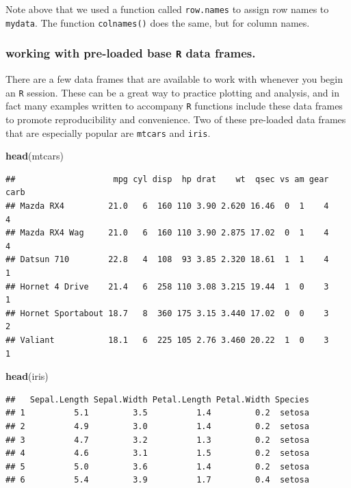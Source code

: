 \documentclass[]{book}
\newenvironment{Shaded}{\begin{snugshade}}{\end{snugshade}}
\newcommand{\KeywordTok}[1]{\textcolor[rgb]{0.13,0.29,0.53}{\textbf{#1}}}
\newcommand{\NormalTok}[1]{#1}
\begin{document}
Note above that we used a function called \texttt{row.names} to assign row names to \texttt{mydata}. The function \texttt{colnames()} does the same, but for column names.

\hypertarget{working-with-pre-loaded-base-r-data-frames.}{%
\subsubsection{\texorpdfstring{working with pre-loaded base \texttt{R} data frames.}{working with pre-loaded base R data frames.}}\label{working-with-pre-loaded-base-r-data-frames.}}

There are a few data frames that are available to work with whenever you begin an \texttt{R} session. These can be a great way to practice plotting and analysis, and in fact many examples written to accompany \texttt{R} functions include these data frames to promote reproducibility and convenience. Two of these pre-loaded data frames that are especially popular are \texttt{mtcars} and \texttt{iris}.

\begin{Shaded}
\begin{Highlighting}[]
\KeywordTok{head}\NormalTok{(mtcars)}
\end{Highlighting}
\end{Shaded}

\begin{verbatim}
##                    mpg cyl disp  hp drat    wt  qsec vs am gear carb
## Mazda RX4         21.0   6  160 110 3.90 2.620 16.46  0  1    4    4
## Mazda RX4 Wag     21.0   6  160 110 3.90 2.875 17.02  0  1    4    4
## Datsun 710        22.8   4  108  93 3.85 2.320 18.61  1  1    4    1
## Hornet 4 Drive    21.4   6  258 110 3.08 3.215 19.44  1  0    3    1
## Hornet Sportabout 18.7   8  360 175 3.15 3.440 17.02  0  0    3    2
## Valiant           18.1   6  225 105 2.76 3.460 20.22  1  0    3    1
\end{verbatim}

\begin{Shaded}
\begin{Highlighting}[]
\KeywordTok{head}\NormalTok{(iris)}
\end{Highlighting}
\end{Shaded}

\begin{verbatim}
##   Sepal.Length Sepal.Width Petal.Length Petal.Width Species
## 1          5.1         3.5          1.4         0.2  setosa
## 2          4.9         3.0          1.4         0.2  setosa
## 3          4.7         3.2          1.3         0.2  setosa
## 4          4.6         3.1          1.5         0.2  setosa
## 5          5.0         3.6          1.4         0.2  setosa
## 6          5.4         3.9          1.7         0.4  setosa
\end{verbatim}
\end{document}
